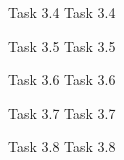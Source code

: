 \documentclass[aspectratio=169]{beamer}
\begin{document}
\begin{frame}[fragile]{Task 3.4}
Task 3.4
\end{frame}

\begin{frame}[fragile]{Task 3.5}
Task 3.5
\end{frame}


\begin{frame}[fragile]{Task 3.6}
Task 3.6
\end{frame}

\begin{frame}[fragile]{Task 3.7}
Task 3.7
\end{frame}


\begin{frame}[fragile]{Task 3.8}
Task 3.8
\end{frame}
\end{document}

